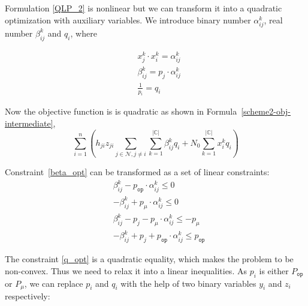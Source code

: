 \documentclass[times]{ettauth}
\theoremstyle{mytheoremstyle}
\theoremstyle{mytheoremstyle}
\theoremstyle{mytheoremstyle}
\begin{document}
Formulation \ref{QLP_2} is nonlinear but we can transform it into a quadratic optimization with auxiliary variables.
We introduce binary number $\alpha_{ij}^k$, real number $\beta_{ij}^k$ and $q_i$, where

	
	\begin{align}
	& x_j^k\cdot x_i^k =\alpha_{ij}^k\label{alpha_opt}\\
	& \beta_{ij}^k = p_j\cdot \alpha_{ij}^k\label{beta_opt}\\
	& \frac{1}{p_i} = q_i\label{q_opt}	
	\end{align}
	
Now the objective function is is quadratic as shown in Formula~\ref{scheme2-obj-intermediate},
	\begin{equation}
	\label{scheme2-obj-intermediate}
	\sum\limits^{n}_{i=1} (h_{ji}z_{ji} \sum\limits_{j\in\mathcal{N}, j\neq i}  \sum\limits_{k=1}^{|\mathbb{C}|}  \beta_{ij}^k q_i  + N_0\sum\limits_{k=1}^{|\mathbb{C}|}  x_i^k q_i )
	\end{equation}
	
	Constraint~\ref{beta_opt} can be transformed as a set of linear constraints:
		\begin{align}
			& \beta_{ij}^k - p_{\mathtt{op}}\cdot \alpha_{ij}^k \leq 0 \label{beta_linearization_1}\\
			& - \beta_{ij}^k + p_\mu\cdot \alpha_{ij}^k \leq 0 \label{beta_linearization_2}\\
			& \beta_{ij}^k - p_j - p_\mu\cdot \alpha_{ij}^k \leq -p_\mu \label{beta_linearization_3}\\			
			& -\beta_{ij}^k + p_j + p_{\mathtt{op}}\cdot \alpha_{ij}^k \leq p_{\mathtt{op}} \label{beta_linearization_4}
	\end{align}
	
	
	The constraint \ref{q_opt} is a quadratic equality, which makes the problem to be non-convex. 
	Thus we need to relax it into a linear inequalities.
	As $p_i$ is either $P_{\mathtt{op}}$ or $P_\mu$, we can replace $p_i$ and $q_i$ with the help of two binary variables $y_i$ and $z_i$ respectively:
\end{document}
